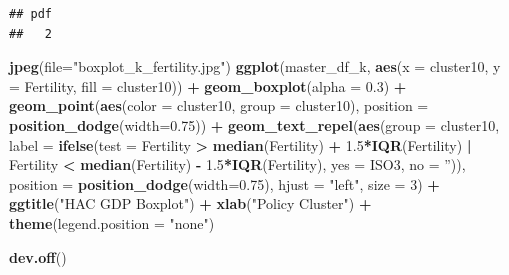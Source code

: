\documentclass[]{article}
\newenvironment{Shaded}{\begin{snugshade}}{\end{snugshade}}
\newcommand{\DataTypeTok}[1]{\textcolor[rgb]{0.13,0.29,0.53}{#1}}
\newcommand{\DecValTok}[1]{\textcolor[rgb]{0.00,0.00,0.81}{#1}}
\newcommand{\FloatTok}[1]{\textcolor[rgb]{0.00,0.00,0.81}{#1}}
\newcommand{\KeywordTok}[1]{\textcolor[rgb]{0.13,0.29,0.53}{\textbf{#1}}}
\newcommand{\NormalTok}[1]{#1}
\newcommand{\OperatorTok}[1]{\textcolor[rgb]{0.81,0.36,0.00}{\textbf{#1}}}
\newcommand{\StringTok}[1]{\textcolor[rgb]{0.31,0.60,0.02}{#1}}
\begin{document}
\begin{verbatim}
## pdf 
##   2
\end{verbatim}

\begin{Shaded}
\begin{Highlighting}[]
\KeywordTok{jpeg}\NormalTok{(}\DataTypeTok{file=}\StringTok{"boxplot_k_fertility.jpg"}\NormalTok{)}
\KeywordTok{ggplot}\NormalTok{(master_df_k, }\KeywordTok{aes}\NormalTok{(}\DataTypeTok{x =}\NormalTok{ cluster10, }\DataTypeTok{y =}\NormalTok{ Fertility, }\DataTypeTok{fill =}\NormalTok{ cluster10)) }\OperatorTok{+}
\StringTok{  }\KeywordTok{geom_boxplot}\NormalTok{(}\DataTypeTok{alpha =} \FloatTok{0.3}\NormalTok{) }\OperatorTok{+}
\StringTok{  }\KeywordTok{geom_point}\NormalTok{(}\KeywordTok{aes}\NormalTok{(}\DataTypeTok{color =}\NormalTok{ cluster10, }\DataTypeTok{group =}\NormalTok{ cluster10), }\DataTypeTok{position =} \KeywordTok{position_dodge}\NormalTok{(}\DataTypeTok{width=}\FloatTok{0.75}\NormalTok{)) }\OperatorTok{+}
\StringTok{  }\KeywordTok{geom_text_repel}\NormalTok{(}\KeywordTok{aes}\NormalTok{(}\DataTypeTok{group =}\NormalTok{ cluster10, }
                \DataTypeTok{label =} \KeywordTok{ifelse}\NormalTok{(}\DataTypeTok{test =}\NormalTok{ Fertility }\OperatorTok{>}\StringTok{ }\KeywordTok{median}\NormalTok{(Fertility) }\OperatorTok{+}\StringTok{ }\FloatTok{1.5}\OperatorTok{*}\KeywordTok{IQR}\NormalTok{(Fertility)}
                               \OperatorTok{|}\StringTok{ }\NormalTok{Fertility }\OperatorTok{<}\StringTok{ }\KeywordTok{median}\NormalTok{(Fertility) }\OperatorTok{-}\StringTok{ }\FloatTok{1.5}\OperatorTok{*}\KeywordTok{IQR}\NormalTok{(Fertility), }
                  \DataTypeTok{yes =}\NormalTok{ ISO3,}
                  \DataTypeTok{no =} \StringTok{''}\NormalTok{)), }
            \DataTypeTok{position =} \KeywordTok{position_dodge}\NormalTok{(}\DataTypeTok{width=}\FloatTok{0.75}\NormalTok{),}
            \DataTypeTok{hjust =} \StringTok{"left"}\NormalTok{, }\DataTypeTok{size =} \DecValTok{3}\NormalTok{) }\OperatorTok{+}\StringTok{ }\KeywordTok{ggtitle}\NormalTok{(}\StringTok{"HAC GDP Boxplot"}\NormalTok{) }\OperatorTok{+}\StringTok{ }\KeywordTok{xlab}\NormalTok{(}\StringTok{"Policy Cluster"}\NormalTok{) }\OperatorTok{+}\StringTok{ }
\StringTok{  }\KeywordTok{theme}\NormalTok{(}\DataTypeTok{legend.position =} \StringTok{"none"}\NormalTok{)}

\KeywordTok{dev.off}\NormalTok{()}
\end{Highlighting}
\end{Shaded}
\end{document}
